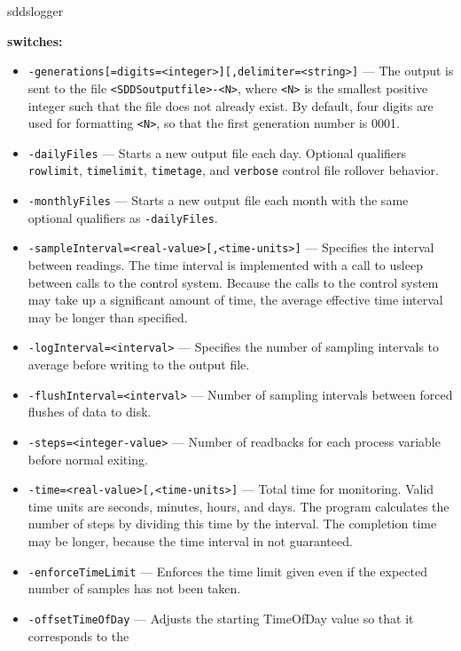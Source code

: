 \begin{sddsprog}{sddslogger}
\item \textbf{switches:}
  \begin{itemize}
    \item {\verb+-generations[=digits=<integer>][,delimiter=<string>]+} ---
      The output is sent to the file \verb+<SDDSoutputfile>-<N>+, where \verb+<N>+ is
      the smallest positive integer such that the file does not already
      exist.  By default, four digits are used for formatting \verb+<N>+, so that
      the first generation number is 0001.
    \item {\tt -dailyFiles} --- Starts a new output file each day. Optional qualifiers
      \verb+rowlimit+, \verb+timelimit+, \verb+timetage+, and \verb+verbose+ control
      file rollover behavior.
    \item {\tt -monthlyFiles} --- Starts a new output file each month with the same optional
      qualifiers as \verb+-dailyFiles+.
    \item {\tt -sampleInterval=<real-value>[,<time-units>]} --- Specifies the interval between readings. The time
      interval is implemented with a call to usleep between calls to the control system.
      Because the calls to the control system may take up a significant amount of time, the average
      effective time interval may be longer than specified.
    \item {\tt -logInterval=<interval>} --- Specifies the number of sampling intervals to average before
      writing to the output file.
    \item {\tt -flushInterval=<interval>} --- Number of sampling intervals between forced flushes of data to disk.
    \item {\tt -steps=<integer-value>} --- Number of readbacks for each process variable before normal exiting.
    \item {\tt -time=<real-value>[,<time-units>]} --- Total time for monitoring. Valid time units are
      seconds, minutes, hours, and days. The program calculates the number of steps by dividing this time
      by the interval. The completion time may be longer, because the time interval in not guaranteed.
    \item {\tt -enforceTimeLimit} --- Enforces the time limit given even if the expected number of samples has
      not been taken.
    \item {\tt -offsetTimeOfDay} --- Adjusts the starting TimeOfDay value so that it corresponds to the

\end{itemize}
\end{sddsprog}
